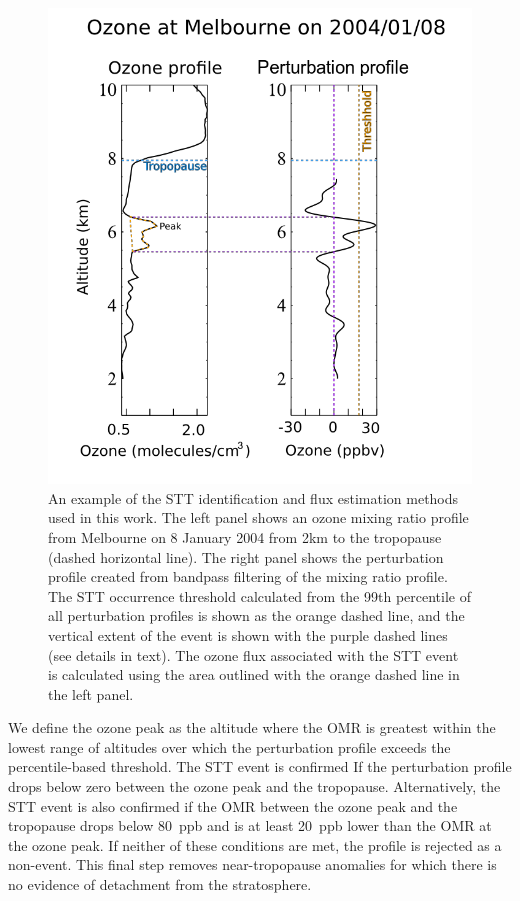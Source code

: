 \documentclass{article}
\begin{document}
    \begin{figure}[!htbp]
      \begin{center}
      \includegraphics[width=0.8\columnwidth]{figures/filtereg.png}
      \caption{ An example of the STT identification and flux estimation methods used in this work. 
	The left panel shows an ozone mixing ratio profile from Melbourne on 8 January 2004 from 2km to the tropopause (dashed horizontal line).
	The right panel shows the perturbation profile created from bandpass filtering of the mixing ratio profile. The STT occurrence threshold calculated from the 99th percentile of all perturbation profiles is shown as the orange dashed line, and the vertical extent of the event is shown with the purple dashed lines (see details in text).
	The ozone flux associated with the STT event is calculated using the area outlined with the orange dashed line in the left panel.
      }
      \label{fig:filterEG}
      \end{center}
    \end{figure}
   
       
    We define the ozone peak as the altitude where the OMR is greatest within the lowest range of altitudes over which the perturbation profile exceeds the percentile-based threshold.
    The STT event is confirmed If the perturbation profile drops below zero between the ozone peak and the tropopause. 
    Alternatively, the STT event is also confirmed if the OMR between the ozone peak and the tropopause drops below 80~ppb and is at least 20~ppb lower than the OMR at the ozone peak. 
    If neither of these conditions are met, the profile is rejected as a non-event.
    This final step removes near-tropopause anomalies for which there is no evidence of detachment from the stratosphere.
\end{document}
